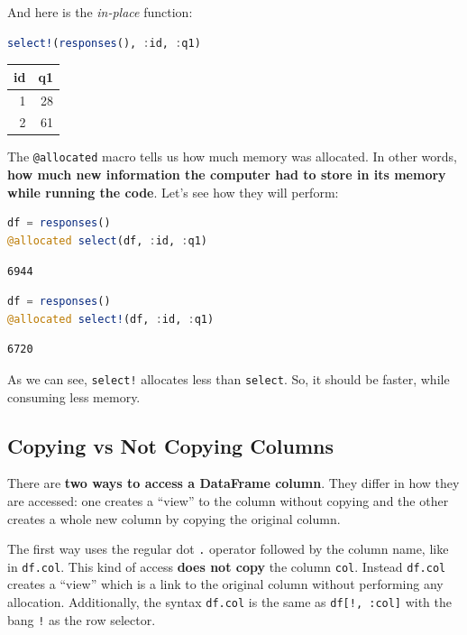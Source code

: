 \documentclass[
  notoc %
]{tufte-book}
\newcommand{\passthrough}[1]{#1}
\begin{document}
And here is the \emph{in-place} function:

\begin{lstlisting}[language=Julia]
select!(responses(), :id, :q1)
\end{lstlisting}

\begin{longtable}[]{@{}rr@{}}
\toprule
id & q1 \\
\midrule
\endhead
1 & 28 \\
2 & 61 \\
\bottomrule
\end{longtable}

The \passthrough{\lstinline!@allocated!} macro tells us how much memory
was allocated. In other words, \textbf{how much new information the
computer had to store in its memory while running the code}. Let's see
how they will perform:

\begin{lstlisting}[language=Julia]
df = responses()
@allocated select(df, :id, :q1)
\end{lstlisting}

\begin{lstlisting}
6944
\end{lstlisting}

\begin{lstlisting}[language=Julia]
df = responses()
@allocated select!(df, :id, :q1)
\end{lstlisting}

\begin{lstlisting}
6720
\end{lstlisting}

As we can see, \passthrough{\lstinline"select!"} allocates less than
\passthrough{\lstinline!select!}. So, it should be faster, while
consuming less memory.

\hypertarget{sec:df_performance_df_copy}{%
\subsection{Copying vs Not Copying
Columns}\label{sec:df_performance_df_copy}}

There are \textbf{two ways to access a DataFrame column}. They differ in
how they are accessed: one creates a ``view'' to the column without
copying and the other creates a whole new column by copying the original
column.

The first way uses the regular dot \passthrough{\lstinline!.!} operator
followed by the column name, like in \passthrough{\lstinline!df.col!}.
This kind of access \textbf{does not copy} the column
\passthrough{\lstinline!col!}. Instead \passthrough{\lstinline!df.col!}
creates a ``view'' which is a link to the original column without
performing any allocation. Additionally, the syntax
\passthrough{\lstinline!df.col!} is the same as
\passthrough{\lstinline"df[!, :col]"} with the bang
\passthrough{\lstinline"!"} as the row selector.
\end{document}
